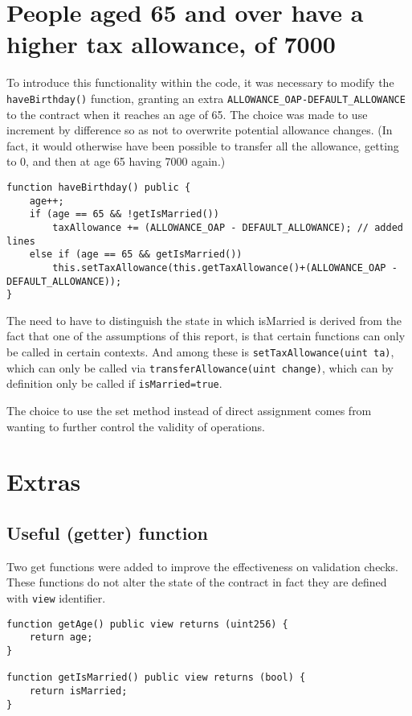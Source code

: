 \documentclass{article}
\begin{document}
\section{People aged 65 and over have a higher tax allowance, of 7000}
To introduce this functionality within the code, it was necessary to modify the \texttt{haveBirthday()} function, granting an extra \texttt{ALLOWANCE\_OAP-DEFAULT\_ALLOWANCE} to the contract when it reaches an age of 65.
The choice was made to use increment by difference so as not to overwrite potential allowance changes. (In fact, it would otherwise have been possible to transfer all the allowance, getting to 0, and then at age 65 having 7000 again.)
\begin{verbatim}
function haveBirthday() public {
    age++;
    if (age == 65 && !getIsMarried()) 
        taxAllowance += (ALLOWANCE_OAP - DEFAULT_ALLOWANCE); // added lines
    else if (age == 65 && getIsMarried()) 
        this.setTaxAllowance(this.getTaxAllowance()+(ALLOWANCE_OAP - DEFAULT_ALLOWANCE));
}
\end{verbatim} 
The need to have to distinguish the state in which isMarried is derived from the fact that one of the assumptions of this report, is that certain functions can only be called in certain contexts. And among these is \texttt{setTaxAllowance(uint ta)}, which can only be called via \texttt{transferAllowance(uint change)}, which can by definition only be called if \texttt{isMarried=true}.

The choice to use the set method instead of direct assignment comes from wanting to further control the validity of operations.
\section{Extras}
\subsection{Useful (getter) function}
Two get functions were added to improve the effectiveness on validation checks. These functions do not alter the state of the contract in fact they are defined with \texttt{view} identifier.
\begin{verbatim}
function getAge() public view returns (uint256) {
    return age;
}

function getIsMarried() public view returns (bool) {
    return isMarried;
}
\end{verbatim}
\end{document}
